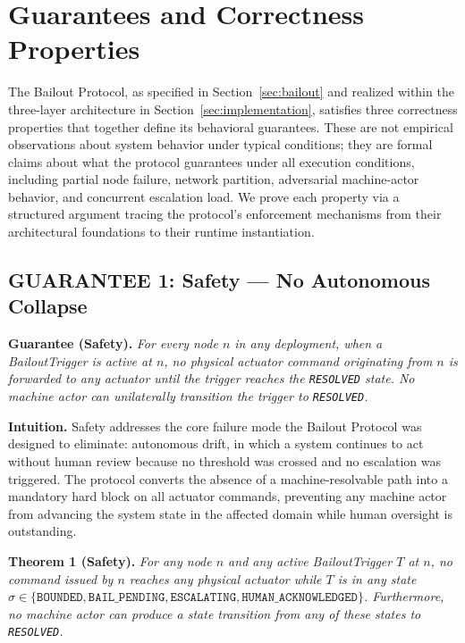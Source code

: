 \section{Guarantees and Correctness Properties}\label{sec:properties}

The Bailout Protocol, as specified in Section~\ref{sec:bailout} and realized within the \bxthree{} three-layer architecture in Section~\ref{sec:implementation}, satisfies three correctness properties that together define its behavioral guarantees. These are not empirical observations about system behavior under typical conditions; they are formal claims about what the protocol guarantees under all execution conditions, including partial node failure, network partition, adversarial machine-actor behavior, and concurrent escalation load. We prove each property via a structured argument tracing the protocol's enforcement mechanisms from their architectural foundations to their runtime instantiation.

\subsection{GUARANTEE 1: Safety — No Autonomous Collapse}\label{sec:safety}

\bigskip
\begin{minipage}{\textwidth}
\textbf{Guarantee (Safety).} \textit{For every node $n$ in any \bxthree{} deployment, when a BailoutTrigger is active at $n$, no physical actuator command originating from $n$ is forwarded to any actuator until the trigger reaches the \texttt{RESOLVED} state. No machine actor can unilaterally transition the trigger to \texttt{RESOLVED}.}
\end{minipage}
\bigskip

\textbf{Intuition.} Safety addresses the core failure mode the Bailout Protocol was designed to eliminate: autonomous drift, in which a system continues to act without human review because no threshold was crossed and no escalation was triggered. The protocol converts the absence of a machine-resolvable path into a mandatory hard block on all actuator commands, preventing any machine actor from advancing the system state in the affected domain while human oversight is outstanding.

\bigskip
\noindent\textbf{Theorem 1 (Safety).}
\textit{For any node $n$ and any active BailoutTrigger $T$ at $n$, no command issued by $n$ reaches any physical actuator while $T$ is in any state $\sigma \in \{\texttt{BOUNDED}, \texttt{BAIL\_PENDING}, \texttt{ESCALATING}, \texttt{HUMAN\_ACKNOWLEDGED}\}$. Furthermore, no machine actor can produce a state transition from any of these states to \texttt{RESOLVED}.}

